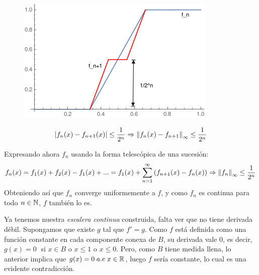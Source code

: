 \begin{figure}[H]
   \center
  \includegraphics[scale=0.6]{img/convergenciaescalera.png}
\end{figure}
\[
\left| f_n(x)-f_{n+1}(x) \right|\leq\frac{1}{2^n} \Rightarrow \left\lVert f_n(x)-f_{n+1}\right\rVert_{\infty}\leq \frac{1}{2^n}
\]

Expresando ahora $f_n$ usando la forma telescópica de una sucesión:
\[
f_n(x)=f_1(x)+f_2(x)-f_1(x)+...=f_1(x)+\sum_{n=1}^\infty\left(f_{n+1}(x)-f_n(x)\right) \Rightarrow \left\lVert f_n\right\rVert_{\infty}\leq \frac{1}{2^n}
\]
Obteniendo así que $f_n$ converge uniformemente a $f$, y como $f_n$ es continua para todo $n\in\mathbb{N}$, $f$ también lo es. 

Ya tenemos nuestra \textit{escalera continua} construida, falta ver que no tiene derivada débil. Supongamos que existe $g$ tal que $f'=g$. Como $f$ está definida como una función constante en cada componente conexa de $B$, su derivada vale 0, es decir, $g(x)=0\;$ si $x \in B$ o $x\leq 1$ o $x\leq 0$. Pero, como $B$ tiene medida llena, lo anterior implica que $g(x)=0 \; a.e \; x\in\mathbb{R}$, luego $f$ sería constante, lo cual es una evidente contradicción.
